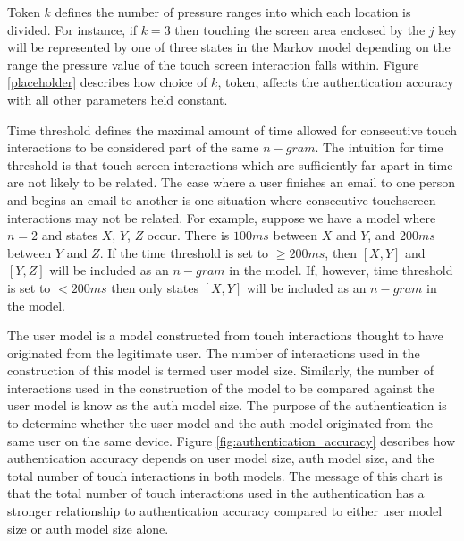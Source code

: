 
Token $k$ defines the number of pressure ranges
into which each location is divided.
%
For instance,
if $k = 3$ 
then touching the screen area enclosed by
the $j$ key will be represented by one of three states
in the Markov model depending on the range the
pressure value of the touch screen interaction falls within.
% 
Figure \ref{placeholder} %
describes how choice of $k$, token, affects the authentication accuracy
with all other parameters held constant.


Time threshold defines the maximal amount of time
allowed for consecutive touch interactions 
to be considered part of the same $n-gram$.
% 
The intuition for time threshold is that
touch screen interactions which are sufficiently far 
apart in time are not likely to be related.
%
The case where a user finishes an email to one person and 
begins an email to another 
is one situation where
consecutive touchscreen interactions may not be related.
%
For example,
suppose we have a model where $n = 2$ and
states $X$, $Y$, $Z$ occur.
There is $100ms$ between $X$ and $Y$, and
$200ms$ between $Y$ and $Z$.
If the time threshold is set to
$\geq 200 ms$, 
then $[X,Y]$ and $[Y,Z]$ will be included as an $n-gram$ in the model.
If, however, time threshold is set to $< 200 ms$
then only states $[X,Y]$ will be included as an $n-gram$ in the model.

The user model is a model constructed from 
touch interactions thought to have originated from
the legitimate user.
The number of interactions used in the construction of this model
is termed user model size.
Similarly,
the number of interactions used in the construction of
the model to be compared against the user model
is know as the auth model size.
%
The purpose of the authentication is
to determine whether the user model and the auth model 
originated from the same user on the same device.
%
Figure \ref{fig:authentication_accuracy}
describes how authentication accuracy depends on 
user model size, auth model size, and 
the total number of touch interactions in both models.
%
The message of this chart is that
the total number of touch interactions used in the authentication
has a stronger relationship to
authentication accuracy compared to either
user model size or auth model size alone.

